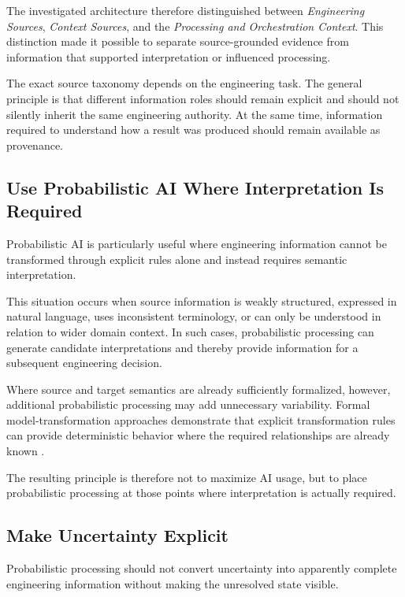 The investigated architecture therefore distinguished between \emph{Engineering Sources},
\emph{Context Sources}, and the \emph{Processing and Orchestration Context}. This distinction
made it possible to separate source-grounded evidence from information that
supported interpretation or influenced processing.

The exact source taxonomy depends on the engineering task. The general principle is that
different information roles should remain explicit and should not silently inherit the same
engineering authority. At the same time, information required to understand how a result was
produced should remain available as provenance.

\subsection{Use Probabilistic AI Where Interpretation Is Required}
\label{sec:principle_probabilistic}

Probabilistic AI is particularly useful where engineering information cannot be transformed
through explicit rules alone and instead requires semantic interpretation.

This situation occurs when source information is weakly structured, expressed in natural
language, uses inconsistent terminology, or can only be understood in relation to wider
domain context. In such cases, probabilistic processing can generate candidate
interpretations and thereby provide information for a subsequent engineering decision.

Where source and target semantics are already sufficiently formalized, however, additional
probabilistic processing may add unnecessary variability. Formal model-transformation
approaches demonstrate that explicit transformation rules can provide deterministic behavior
where the required relationships are already known \cite{Kapos.2014,Li.2022,Zhou.2024}.

The resulting principle is therefore not to maximize AI usage, but to place probabilistic
processing at those points where interpretation is actually required.

\subsection{Make Uncertainty Explicit}
\label{sec:principle_uncertainty}

Probabilistic processing should not convert uncertainty into apparently complete engineering
information without making the unresolved state visible.


